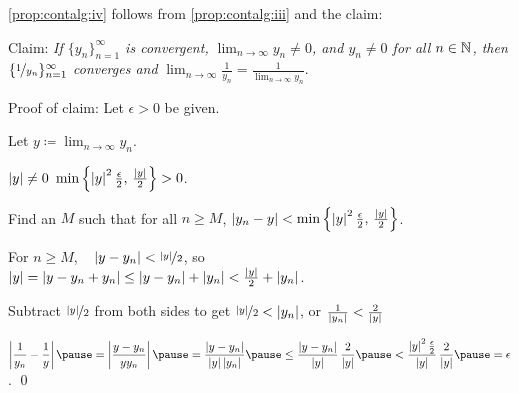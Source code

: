 \documentclass[10pt,aspectratio=149]{beamer}
\begin{document}
\begin{frame}

\eqref{prop:contalg:iv} follows from 
\eqref{prop:contalg:iii} and the claim:

\medskip

Claim: \emph{If $\{ y_n \}_{n=1}^\infty$ is convergent,
$\displaystyle \lim_{n\to\infty} y_n \not= 0$, and $y_n \not= 0$ for all $n \in {\mathbb{N}}$, then
$\{ \nicefrac{1}{y_n} \}_{n=1}^\infty$ converges and}
$\displaystyle \lim_{n\to\infty} \frac{1}{y_n} = \frac{1}{\lim_{n\to\infty} y_n}$.

\pause
\medskip

Proof of claim:  Let $\epsilon > 0$ be given.

\pause
Let $\displaystyle y \coloneqq \lim_{n\to\infty} y_n$.

\pause
$\left\lvert {y} \right\rvert \not= 0$ \wthus $\min \left\{ \left\lvert {y} \right\rvert^2\frac{\epsilon}{2}, \, \frac{\left\lvert {y} \right\rvert}{2} \right\} > 0$.

\pause
Find an $M$ such that for all $n \geq M$,
\quad $\left\lvert {y_n - y} \right\rvert < \min \left\{ \left\lvert {y} \right\rvert^2\frac{\epsilon}{2}, \, \frac{\left\lvert {y} \right\rvert}{2}
\right\}$.

\pause
\medskip

For $n \geq M$, ~
$\left\lvert {y - y_n} \right\rvert < \nicefrac{\left\lvert {y} \right\rvert}{2}$, so
\pause
~~
$\left\lvert {y} \right\rvert = 
\left\lvert {y - y_n + y_n } \right\rvert \leq
\left\lvert {y - y_n} \right\rvert + \left\lvert { y_n } \right\rvert < \frac{\left\lvert {y} \right\rvert}{2} + \left\lvert {y_n} \right\rvert$.

\pause
\medskip

Subtract $\nicefrac{\left\lvert {y} \right\rvert}{2}$ from both sides to get
$\nicefrac{\left\lvert {y} \right\rvert}{2} < \left\lvert {y_n} \right\rvert$, \quad or \quad
$\frac{1}{\left\lvert {y_n} \right\rvert} < \frac{2}{\left\lvert {y} \right\rvert}$

\pause
\medskip
$\displaystyle
\abs{\frac{1}{y_n} - \frac{1}{y}}
\pause
=
\abs{\frac{y - y_n}{y y_n}} 
\pause
=
\frac{\abs{y - y_n}}{\abs{y} \abs{y_n}} 
\pause
\leq
\frac{\abs{y - y_n}}{\abs{y}} \, \frac{2}{\abs{y}} 
\pause
<
\frac{\abs{y}^2 \frac{\epsilon}{2}}{\abs{y}} \, \frac{2}{\abs{y}}
\pause
= \epsilon$.
\qed

\end{frame}
\end{document}

